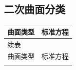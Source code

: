 \subsection{二次曲面分类}
	\begin{center}
			\renewcommand\arraystretch{1.5}
		\begin{longtable}{|l|c|c|}%
			\hline
			\multicolumn{2}{|c|}{曲面类型}         & 标准方程 \\

			\hline
			\endfirsthead
			
			\multicolumn{3}{l}{续表}  \\
			\hline
			\multicolumn{2}{|c|}{曲面类型}         & 标准方程 \\

			\hline
			\endhead
			
			\hline
			\endfoot
			

\end{longtable}
\end{center}
